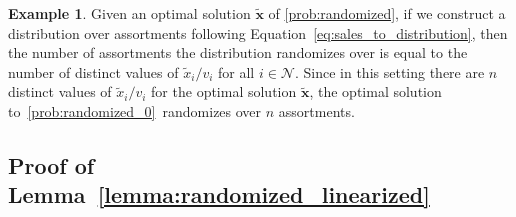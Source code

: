 \documentclass[mnsc,non-blindrev]{informs3}
\theoremstyle{definition}
\newtheorem{example}[theorem]{Example}
\begin{document}
\begin{appendices}{\Large{}}
\begin{example}
Given an optimal solution $\tilde{\bm{x}}$ of \ref{prob:randomized}, if we construct a distribution over assortments following Equation~\eqref{eq:sales_to_distribution}, then the number of assortments the distribution randomizes over is equal to the number of distinct values of $\tilde{x}_i/v_i$ for all $i\in\mathcal{N}$. Since in this setting there are $n$ distinct values of $\tilde{x}_i/v_i$ for the optimal solution $\tilde{\bm{x}}$, the optimal solution to~\ref{prob:randomized_0}~randomizes over $n$ assortments.
\end{example}

\subsection{Proof of Lemma~\ref{lemma:randomized_linearized}}\label{sec:lemma:randomized_linearized}


\end{appendices}
\end{document}
